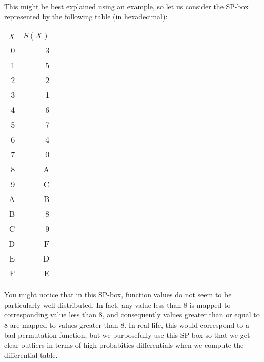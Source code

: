 This might be best explained using an example, so let us consider the SP-box 
represented by the following table (in hexadecimal):
\begin{center}
\begin{tabular}{|r|r|}
\hline
$X$ & $S(X)$ \\\hline
0 & 3 \\\hline
1 & 5 \\\hline
2 & 2 \\\hline
3 & 1 \\\hline
4 & 6 \\\hline
5 & 7 \\\hline
6 & 4 \\\hline
7 & 0 \\\hline
8 & A \\\hline
9 & C \\\hline
A & B \\\hline
B & 8 \\\hline
C & 9 \\\hline
D & F \\\hline
E & D \\\hline
F & E \\\hline
\end{tabular}
\end{center}
You might notice that in this SP-box, function values do not seem to be particularly
well distributed. In fact, any value less than 8 is mapped to corresponding
value less than 8, and consequently values greater than or equal to 8 are mapped
to values greater than 8. In real life, this would correspond to a bad permutation
function, but we purposefully use this SP-box so that we get clear outliers in terms of
high-probabities differentials when we compute the differential table.

